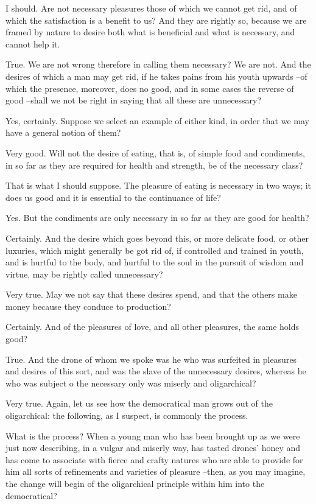 I should.
Are not necessary pleasures those of which we cannot get rid, and of which the satisfaction is a benefit to us? And they are rightly so, because we are framed by nature to desire both what is beneficial and what is necessary, and cannot help it.

True.
We are not wrong therefore in calling them necessary?
We are not.
And the desires of which a man may get rid, if he takes pains from his youth upwards --of which the presence, moreover, does no good, and in some cases the reverse of good --shall we not be right in saying that all these are unnecessary?

Yes, certainly.
Suppose we select an example of either kind, in order that we may have a general notion of them?

Very good.
Will not the desire of eating, that is, of simple food and condiments, in so far as they are required for health and strength, be of the necessary class?

That is what I should suppose.
The pleasure of eating is necessary in two ways; it does us good and it is essential to the continuance of life?

Yes.
But the condiments are only necessary in so far as they are good for health?

Certainly.
And the desire which goes beyond this, or more delicate food, or other luxuries, which might generally be got rid of, if controlled and trained in youth, and is hurtful to the body, and hurtful to the soul in the pursuit of wisdom and virtue, may be rightly called unnecessary?

Very true.
May we not say that these desires spend, and that the others make money because they conduce to production?

Certainly.
And of the pleasures of love, and all other pleasures, the same holds good?

True.
And the drone of whom we spoke was he who was surfeited in pleasures and desires of this sort, and was the slave of the unnecessary desires, whereas he who was subject o the necessary only was miserly and oligarchical?

Very true.
Again, let us see how the democratical man grows out of the oligarchical: the following, as I suspect, is commonly the process.

What is the process?
When a young man who has been brought up as we were just now describing, in a vulgar and miserly way, has tasted drones' honey and has come to associate with fierce and crafty natures who are able to provide for him all sorts of refinements and varieties of pleasure --then, as you may imagine, the change will begin of the oligarchical principle within him into the democratical?

